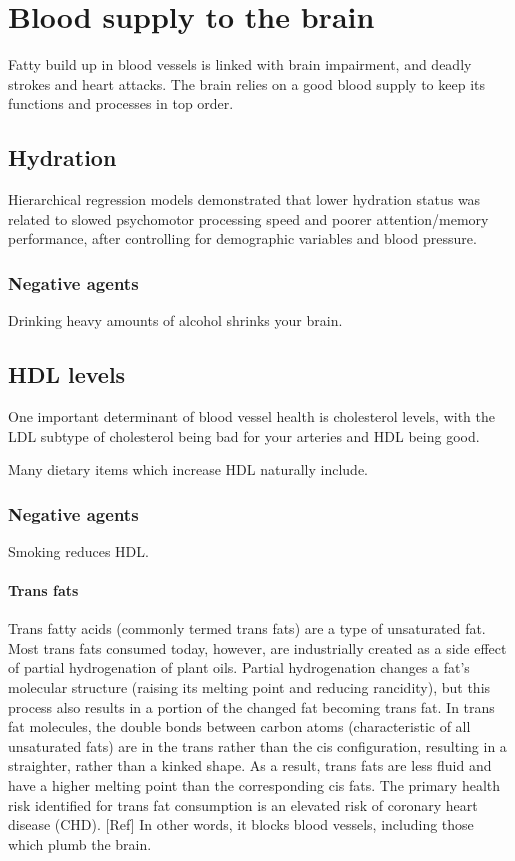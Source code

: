 \documentclass[oneside, article]{memoir}
\begin{document}
\section{Blood supply to the brain}
Fatty build up in blood vessels is linked with brain impairment, and deadly strokes and heart attacks. The brain relies on a good blood supply to keep its functions and processes in top order.

\subsection{Hydration}
Hierarchical regression models demonstrated that lower hydration status was related to slowed psychomotor processing speed and poorer attention/memory performance, after controlling for demographic variables and blood pressure. 

\subsubsection{Negative agents}
Drinking heavy amounts of alcohol shrinks your brain.

\subsection{HDL levels}
One important determinant of blood vessel health is cholesterol levels, with the LDL subtype of cholesterol being bad for your arteries and HDL being good.

Many dietary items which increase HDL naturally include.

\subsubsection{Negative agents}
Smoking reduces HDL.

\paragraph*{Trans fats}
Trans fatty acids (commonly termed trans fats) are a type of unsaturated fat. Most trans fats consumed today, however, are industrially created as a side effect of partial hydrogenation of plant oils. Partial hydrogenation changes a fat's molecular structure (raising its melting point and reducing rancidity), but this process also results in a portion of the changed fat becoming trans fat. In trans fat molecules, the double bonds between carbon atoms (characteristic of all unsaturated fats) are in the trans rather than the cis configuration, resulting in a straighter, rather than a kinked shape. As a result, trans fats are less fluid and have a higher melting point than the corresponding cis fats. The primary health risk identified for trans fat consumption is an elevated risk of coronary heart disease (CHD).  [Ref] In other words, it blocks blood vessels, including those which plumb the brain.
\end{document}

